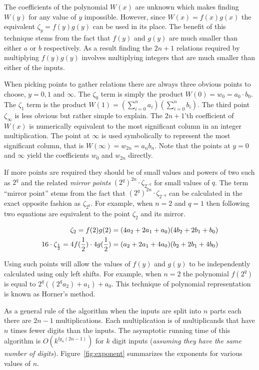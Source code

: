 \documentclass[b5paper]{book}
\begin{document}
The coefficients of the polynomial $W(x)$ are unknown which makes finding $W(y)$ for any value of $y$ impossible.  However, since 
$W(x) = f(x)g(x)$ the equivalent $\zeta_y = f(y) g(y)$ can be used in its place.  The benefit of this technique stems from the 
fact that $f(y)$ and $g(y)$ are much smaller than either $a$ or $b$ respectively.  As a result finding the $2n + 1$ relations required 
by multiplying $f(y)g(y)$ involves multiplying integers that are much smaller than either of the inputs.

When picking points to gather relations there are always three obvious points to choose, $y = 0, 1$ and $ \infty$.  The $\zeta_0$ term
is simply the product $W(0) = w_0 = a_0 \cdot b_0$.  The $\zeta_1$ term is the product 
$W(1) = \left (\sum_{i = 0}^{n} a_i \right ) \left (\sum_{i = 0}^{n} b_i \right )$.  The third point $\zeta_{\infty}$ is less obvious but rather
simple to explain.  The $2n + 1$'th coefficient of $W(x)$ is numerically equivalent to the most significant column in an integer multiplication.  
The point at $\infty$ is used symbolically to represent the most significant column, that is $W(\infty) = w_{2n} = a_nb_n$.  Note that the 
points at $y = 0$ and $\infty$ yield the coefficients $w_0$ and $w_{2n}$ directly.

If more points are required they should be of small values and powers of two such as $2^q$ and the related \textit{mirror points} 
$\left (2^q \right )^{2n}  \cdot \zeta_{2^{-q}}$ for small values of $q$.  The term ``mirror point'' stems from the fact that 
$\left (2^q \right )^{2n}  \cdot \zeta_{2^{-q}}$ can be calculated in the exact opposite fashion as $\zeta_{2^q}$.  For
example, when $n = 2$ and $q = 1$ then following two equations are equivalent to the point $\zeta_{2}$ and its mirror.

\begin{eqnarray}
\zeta_{2}                  = f(2)g(2) = (4a_2 + 2a_1 + a_0)(4b_2 + 2b_1 + b_0) \nonumber \\
16 \cdot \zeta_{1 \over 2} = 4f({1\over 2}) \cdot 4g({1 \over 2}) = (a_2 + 2a_1 + 4a_0)(b_2 + 2b_1 + 4b_0)
\end{eqnarray}

Using such points will allow the values of $f(y)$ and $g(y)$ to be independently calculated using only left shifts.  For example, when $n = 2$ the
polynomial $f(2^q)$ is equal to $2^q((2^qa_2) + a_1) + a_0$.  This technique of polynomial representation is known as Horner's method.  

As a general rule of the algorithm when the inputs are split into $n$ parts each there are $2n - 1$ multiplications.  Each multiplication is of 
multiplicands that have $n$ times fewer digits than the inputs.  The asymptotic running time of this algorithm is 
$O \left ( k^{lg_n(2n - 1)} \right )$ for $k$ digit inputs (\textit{assuming they have the same number of digits}).  Figure~\ref{fig:exponent}
summarizes the exponents for various values of $n$.
\end{document}

